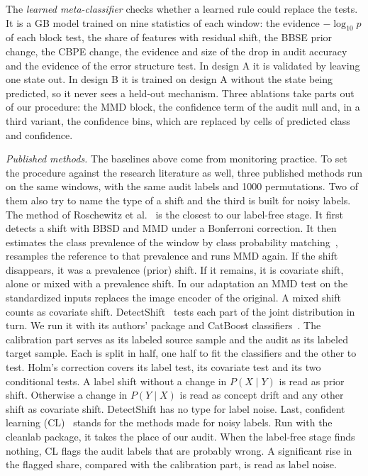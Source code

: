 \documentclass[pdflatex,referee,lineno,sn-basic]{sn-jnl}
\begin{document}
The \emph{learned meta-classifier} checks whether a learned rule could replace the tests. It is a GB model trained on nine statistics of each window: the evidence $-\log_{10}p$ of each block test, the share of features with residual shift, the BBSE prior change, the CBPE change, the evidence and size of the drop in audit accuracy and the evidence of the error structure test. In design A it is validated by leaving one state out. In design B it is trained on design A without the state being predicted, so it never sees a held-out mechanism. Three ablations take parts out of our procedure: the MMD block, the confidence term of the audit null and, in a third variant, the confidence bins, which are replaced by cells of predicted class and confidence.

\emph{Published methods.} The baselines above come from monitoring practice. To set the procedure against the research literature as well, three published methods run on the same windows, with the same audit labels and 1000 permutations. Two of them also try to name the type of a shift and the third is built for noisy labels. The method of Roschewitz et al.~\citeyearpar{roschewitz2025shiftid} is the closest to our label-free stage. It first detects a shift with BBSD and MMD under a Bonferroni correction. It then estimates the class prevalence of the window by class probability matching~\citep{wen2024cpmcn}, resamples the reference to that prevalence and runs MMD again. If the shift disappears, it was a prevalence (prior) shift. If it remains, it is covariate shift, alone or mixed with a prevalence shift. In our adaptation an MMD test on the standardized inputs replaces the image encoder of the original. A mixed shift counts as covariate shift. DetectShift~\citep{maiapolo2023detectshift} tests each part of the joint distribution in turn. We run it with its authors' package and CatBoost classifiers~\citep{prokhorenkova2018catboost}. The calibration part serves as its labeled source sample and the audit as its labeled target sample. Each is split in half, one half to fit the classifiers and the other to test. Holm's correction covers its label test, its covariate test and its two conditional tests. A label shift without a change in $P(X\mid Y)$ is read as prior shift. Otherwise a change in $P(Y\mid X)$ is read as concept drift and any other shift as covariate shift. DetectShift has no type for label noise. Last, confident learning (CL)~\citep{northcutt2021confident} stands for the methods made for noisy labels. Run with the cleanlab package, it takes the place of our audit. When the label-free stage finds nothing, CL flags the audit labels that are probably wrong. A significant rise in the flagged share, compared with the calibration part, is read as label noise.
\end{document}

